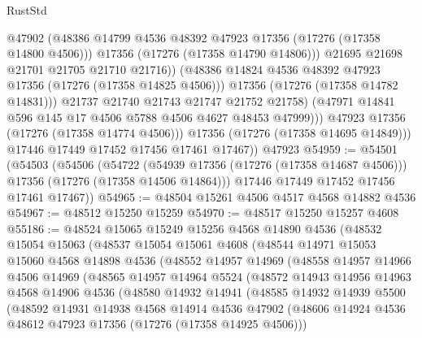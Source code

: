 \begin{lexlean}{RustStd}
\begin{coremodule}
                          @47902
                          (@48386 @14799 @4536 @48392 @47923 @17356 (@17276 (@17358 @14800 @4506)))
                          @17356
                          (@17276 (@17358 @14790 @14806)))
                        @21695
                        @21698
                        @21701
                        @21705
                        @21710
                        @21716))
                    (@48386 @14824 @4536 @48392 @47923 @17356 (@17276 (@17358 @14825 @4506)))
                    @17356
                    (@17276 (@17358 @14782 @14831)))
                  @21737
                  @21740
                  @21743
                  @21747
                  @21752
                  @21758)
                (@47971 @14841 @596 @145 @17 @4506 @5788 @4506 @4627 @48453 @47999)))
            @47923
            @17356
            (@17276 (@17358 @14774 @4506)))
          @17356
          (@17276 (@17358 @14695 @14849)))
        @17446
        @17449
        @17452
        @17456
        @17461
        @17467))
    @47923
@54959 := @54501
    (@54503
      (@54506
        (@54722
          (@54939 @17356 (@17276 (@17358 @14687 @4506)))
          @17356
          (@17276 (@17358 @14506 @14864)))
        @17446
        @17449
        @17452
        @17456
        @17461
        @17467))
@54965 := @48504 @15261 @4506 @4517 @4568 @14882 @4536
@54967 := @48512 @15250 @15259
@54970 := @48517 @15250 @15257 @4608
@55186 := @48524
    @15065
    @15249
    @15256
    @4568
    @14890
    @4536
    (@48532
      @15054
      @15063
      (@48537
        @15054
        @15061
        @4608
        (@48544
          @14971
          @15053
          @15060
          @4568
          @14898
          @4536
          (@48552
            @14957
            @14969
            (@48558
              @14957
              @14966
              @4506
              @14969
              (@48565
                @14957
                @14964
                @5524
                (@48572
                  @14943
                  @14956
                  @14963
                  @4568
                  @14906
                  @4536
                  (@48580
                    @14932
                    @14941
                    (@48585
                      @14932
                      @14939
                      @5500
                      (@48592
                        @14931
                        @14938
                        @4568
                        @14914
                        @4536
                        @47902
                        (@48606 @14924 @4536 @48612 @47923 @17356 (@17276 (@17358 @14925 @4506)))

\end{coremodule}
\end{lexlean}
